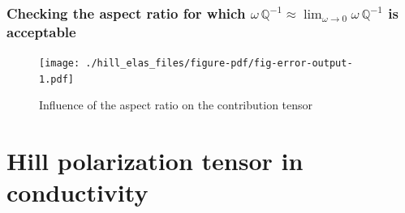 \documentclass[
  letterpaper,
  DIV=11,
  numbers=noendperiod]{scrreprt}
\newenvironment{Shaded}{\begin{snugshade}}{\end{snugshade}}
\newcommand{\ControlFlowTok}[1]{\textcolor[rgb]{0.13,0.29,0.53}{\textbf{#1}}}
\newcommand{\DecValTok}[1]{\textcolor[rgb]{0.00,0.00,0.81}{#1}}
\newcommand{\KeywordTok}[1]{\textcolor[rgb]{0.13,0.29,0.53}{\textbf{#1}}}
\newcommand{\NormalTok}[1]{#1}
\newcommand{\OperatorTok}[1]{\textcolor[rgb]{0.81,0.36,0.00}{\textbf{#1}}}
\newcommand{\SpecialCharTok}[1]{\textcolor[rgb]{0.00,0.00,0.00}{#1}}
\newcommand{\StringTok}[1]{\textcolor[rgb]{0.31,0.60,0.02}{#1}}
\newcommand{\VariableTok}[1]{\textcolor[rgb]{0.00,0.00,0.00}{#1}}
\newcommand{\VerbatimStringTok}[1]{\textcolor[rgb]{0.31,0.60,0.02}{#1}}
\begin{document}
\hypertarget{checking-the-aspect-ratio-for-which-omegamathbbq-1approx-lim_omegato-0omegamathbbq-1-is-acceptable}{%
\subsection{\texorpdfstring{Checking the aspect ratio for which
\(\omega\,{\mathbb{{Q}}}^{-1}\approx \lim_{\omega\to 0}\omega\,{\mathbb{{Q}}}^{-1}\)
is
acceptable}{Checking the aspect ratio for which \textbackslash omega\textbackslash,\{\textbackslash mathbb\{\{Q\}\}\}\^{}\{-1\}\textbackslash approx \textbackslash lim\_\{\textbackslash omega\textbackslash to 0\}\textbackslash omega\textbackslash,\{\textbackslash mathbb\{\{Q\}\}\}\^{}\{-1\} is acceptable}}\label{checking-the-aspect-ratio-for-which-omegamathbbq-1approx-lim_omegato-0omegamathbbq-1-is-acceptable}}

\begin{Shaded}
\end{Shaded}

\begin{figure}[H]

{\centering \texttt{[image: ./hill\_elas\_files/figure-pdf/fig-error-output-1.pdf]}

}

\caption{\label{fig-error}Influence of the aspect ratio on the
contribution tensor}

\end{figure}

\hypertarget{sec-hill_cond}{%
\chapter{Hill polarization tensor in conductivity}\label{sec-hill_cond}}
\end{document}

